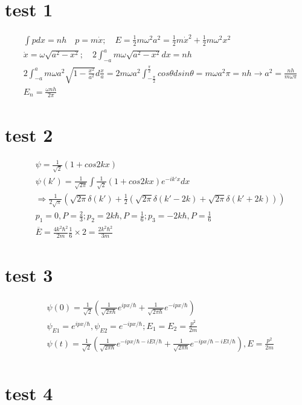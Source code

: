 \documentclass{article}
\begin{document}
\section{test 1}
\begin{align*}
  &\int pdx=nh\quad p=m\dot x ;\quad E=\frac12 m\omega^2 a^2=\frac12m\dot x^2+\frac12m\omega^2 x^2 \\
  &\dot x=\omega\sqrt{a^2-x^2} ;\quad 2\int ^a_{-a}m\omega\sqrt{a^2-x^2}dx=nh \\
  &2\int^a_{-a}m\omega a^2\sqrt{1-\frac{x^2}{a^2}}d\frac{x}a=2m\omega a^2 \int^{\frac{\pi}2}_{-\frac{\pi}2}cos\theta dsin\theta=m\omega a^2\pi=nh \rightarrow a^2=\frac{nh}{m\omega\pi} \\
  & E_n= \frac{\omega nh}{2 \pi}
\end{align*}

\section{test 2}

\begin{align*}
  &\psi=\frac1{\sqrt{2}}(1+cos2kx) \\
  &\psi(k')=\frac1{\sqrt{2\pi}}\int \frac1{\sqrt{2}}(1+cos2kx)e^{-ik'x} dx \\
  &\Rightarrow \frac1{2\sqrt{\pi}}(\sqrt{2\pi} \delta (k')+\frac12(\sqrt{2\pi} \delta (k'-2k)+\sqrt{2\pi} \delta (k'+2k) )) \\
  &p_1=0,P=\frac23;p_2=2k\hbar,P=\frac16;p_3=-2k\hbar,P=\frac16 \\
  &\overline E=\frac{4k^2\hbar^2}{2m}\frac16\times 2=\frac{2k^2\hbar^2}{3m}
\end{align*}


\section{test 3}

\begin{align*}
  &\psi(0)=\frac1{\sqrt{2}}(\frac1{\sqrt{2\pi\hbar}}e^{ipx/\hbar}+\frac1{\sqrt{2\pi\hbar}}e^{-ipx/\hbar} )  \\
  &\psi_{E1}=e^{ipx/\hbar},\psi_{E2}=e^{-ipx/\hbar};E_1=E_2=\frac{p^2}{2m} \\
  &\psi(t)=\frac1{\sqrt{2}}(\frac1{\sqrt{2\pi\hbar}}e^{-ipx/\hbar-iEt/\hbar}+\frac1{\sqrt{2\pi\hbar}}e^{-ipx/\hbar-iEt/\hbar} ),E=\frac{p^2}{2m} \\
\end{align*}

\section{test 4}
\end{document}
